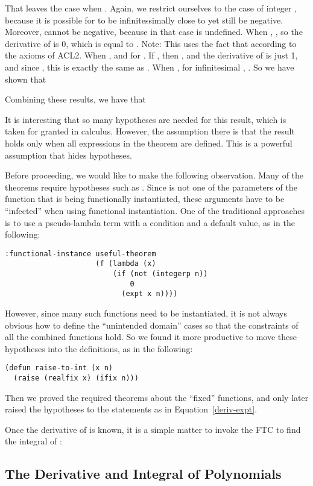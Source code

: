 \documentclass[copyright,creativecommons]{eptcs}
\begin{document}
That leaves the case when . Again, we restrict ourselves to the
case of integer , because it is possible for  to be
infinitessimally close to  yet still be negative. Moreover, 
cannot be negative, because in that case  is undefined.
When , , so the derivative of  is 0, which is equal
to . Note: This uses the fact that  according to the axioms of ACL2.
When ,  and  for . If , then
, and the derivative of  is just 1, and
since , this is exactly the same as .  When , for infinitesimal , . So we have shown that 


Combining these results, we have that

It is interesting that so many hypotheses are needed for this result,
which is taken for granted in calculus. However, the assumption there
is that the result holds only when all expressions in the theorem are
defined. This is a powerful assumption that hides hypotheses.

Before proceeding, we would like to make the following
observation. Many of the theorems require hypotheses such as . Since  is not one of the parameters of the function
 that is being functionally instantiated, these arguments have to
be ``infected'' when using functional instantiation. One of the
traditional approaches is to use a pseudo-lambda term with a condition
and a default value, as in the following:
\begin{lstlisting}
:functional-instance useful-theorem
                     (f (lambda (x)
                         (if (not (integerp n))
                             0
                           (expt x n))))
\end{lstlisting}
However, since many such functions need to be instantiated, it is not
always obvious how to define the ``unintended domain'' cases so that
the constraints of all the combined functions hold. So we found it more
productive to move these hypotheses into the definitions, as in the
following:
\begin{lstlisting}
(defun raise-to-int (x n)
  (raise (realfix x) (ifix n)))
\end{lstlisting}
Then we proved the required theorems about the ``fixed'' functions,
and only later raised the hypotheses to the statements as in Equation~\ref{deriv-expt}.

Once the derivative of  is known, it is a simple matter to invoke
the FTC to find the integral of :


\subsection{The Derivative and Integral of Polynomials}
\end{document}
